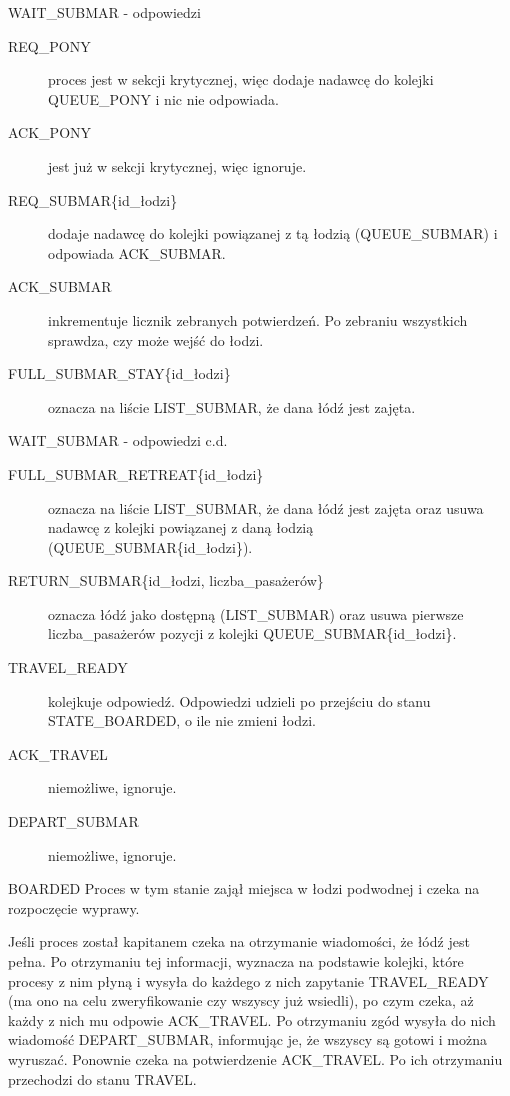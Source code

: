 \documentclass{beamer}
\begin{document}
\begin{frame}{WAIT\_SUBMAR - odpowiedzi}
    \internallinenumbers
    \resetlinenumber[1]
    \begin{description}
        \item [REQ\_PONY] proces jest w sekcji krytycznej, więc dodaje nadawcę do kolejki QUEUE\_PONY i nic nie odpowiada. 
        \item [ACK\_PONY] jest już w sekcji krytycznej, więc ignoruje.
        \item [REQ\_SUBMAR\{id\_łodzi\}] dodaje nadawcę do kolejki powiązanej z tą łodzią (QUEUE\_SUBMAR) i odpowiada ACK\_SUBMAR.
        \item [ACK\_SUBMAR] inkrementuje licznik zebranych potwierdzeń. Po zebraniu wszystkich sprawdza, czy może wejść do łodzi.
        \item [FULL\_SUBMAR\_STAY\{id\_łodzi\}] oznacza na liście LIST\_SUBMAR, że dana łódź jest zajęta.

    \end{description}
\end{frame}

\begin{frame}{WAIT\_SUBMAR - odpowiedzi c.d.}
    \internallinenumbers
    \resetlinenumber[1]
    \begin{description}
        \item [FULL\_SUBMAR\_RETREAT\{id\_łodzi\}] oznacza na liście LIST\_SUBMAR, że dana łódź jest zajęta oraz usuwa nadawcę z kolejki powiązanej z daną łodzią (QUEUE\_SUBMAR\{id\_łodzi\}).
        \item [RETURN\_SUBMAR\{id\_łodzi, liczba\_pasażerów\}] oznacza łódź jako dostępną (LIST\_SUBMAR) oraz usuwa pierwsze liczba\_pasażerów pozycji z kolejki QUEUE\_SUBMAR\{id\_łodzi\}.
        \item [TRAVEL\_READY] kolejkuje odpowiedź. Odpowiedzi udzieli po przejściu do stanu STATE\_BOARDED, o ile nie zmieni łodzi.
        \item [ACK\_TRAVEL] niemożliwe, ignoruje.
        \item [DEPART\_SUBMAR] niemożliwe, ignoruje.
    \end{description}
\end{frame}

\begin{frame}{BOARDED}
    \internallinenumbers
    \resetlinenumber[1]
    Proces w tym stanie zajął miejsca w łodzi podwodnej i czeka na rozpoczęcie wyprawy.

    \vspace{0.4cm}
    Jeśli proces został kapitanem czeka na otrzymanie wiadomości, że łódź jest pełna. Po otrzymaniu tej informacji, wyznacza na podstawie kolejki, które procesy z nim płyną i wysyła do każdego z nich zapytanie TRAVEL\_READY (ma ono na celu zweryfikowanie czy wszyscy już wsiedli), po czym czeka, aż każdy z nich mu odpowie ACK\_TRAVEL. Po otrzymaniu zgód wysyła do nich wiadomość DEPART\_SUBMAR, informując je, że wszyscy są gotowi i można wyruszać. Ponownie czeka na potwierdzenie ACK\_TRAVEL. Po ich otrzymaniu przechodzi do stanu TRAVEL.
\end{frame}
\end{document}
